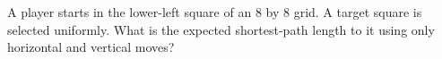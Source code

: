 A player starts in the lower-left square of an $8$ by $8$ grid. A target square is selected uniformly. What is the expected shortest-path length to it using only horizontal and vertical moves?
